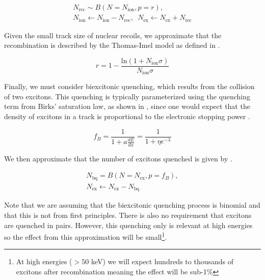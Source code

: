 \begin{equation}
        \label{eqn:xe1t_nr_recombination}
        \begin{gathered}
                N_{\textrm{rec}} \sim B(N = N_{\textrm{ion}}, p = r), \\ 
                N_{\textrm{ion}} \leftarrow N_{\textrm{ion}} - N_{\textrm{rec}}, \, \, \,  N_{\textrm{ex}} \leftarrow N_{\textrm{ex}} + N_{\textrm{rec}}
        \end{gathered}
\end{equation}

Given the small track size of nuclear recoils, we approximate that the recombination is described by the Thomas-Imel model \cite{thomas1987recombination} as defined in .


\begin{equation}
        \label{eqn:xe1t_ti_model}
        r = 1 - \frac{\textrm{ln}(1 + N_{\textrm{ion}} \sigma)}{N_{\textrm{ion}} \sigma}
\end{equation}


Finally, we must consider biexcitonic quenching, which results from the collision of two excitons.  This quenching is typically parameterized using the quenching term from Birks' saturation law, as shown in , since one would expect that the density of excitons in a track is proportional to the electronic stopping power \cite{mei2008model, tretyak2010semi, bezrukov2011interplay}. 

\begin{equation}
        \label{eqn:birks_quenching}
        f_B = \frac{1}{1 + a \frac{dE}{dx}} = \frac{1}{1 + \eta \epsilon^{- \lambda}}
\end{equation}


We then approximate that the number of excitons quenched is given by .

\begin{equation}
        \label{eqn:xe1t_biexcitonic_quenching}
        \begin{gathered}
                N_{\textrm{bq}} = B(N=N_{\textrm{ex}}, p = f_B), \\
                N_{\textrm{ex}} \leftarrow N_{\textrm{ex}} - N_{\textrm{bq}}
        \end{gathered}
\end{equation}


Note that we are assuming that the biexcitonic quenching process is binomial and that this is not from first principles.  There is also no requirement that excitons are quenched in pairs.  However, this quenching only is relevant at high energies so the effect from this approximation will be small\footnote{At high energies ($> 50$ keV) we will expect hundreds to thousands of excitons after recombination meaning the effect will be sub-1\%}.

